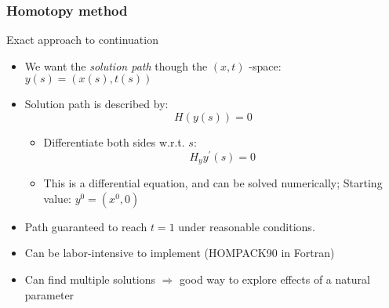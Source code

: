 \documentclass[bigger]{beamer}
\begin{document}
\begin{frame}%
\frametitle{Homotopy method}

Exact approach to continuation

\begin{itemize}
\item We want the \emph{solution path} though the $\left( x,t\right) $%
-space: $y(s)=(x(s),t(s))$

\item Solution path is described by:%
\begin{equation*}
H(y(s))=0
\end{equation*}

\begin{itemize}
\item Differentiate both sides w.r.t. $s$:%
\begin{equation*}
H_{y}y^{\prime }(s)=0
\end{equation*}

\item This is a differential equation, and can be solved numerically;\newline
Starting value: $y^{0}=(x^{0},0)$
\end{itemize}

\item Path guaranteed to reach $t=1$ under reasonable conditions.

\item Can be labor-intensive to implement (HOMPACK90 in Fortran)

\item Can find multiple solutions $\Rightarrow $ good way to explore effects
of a natural parameter
\end{itemize}


\end{frame}%
\end{document}

